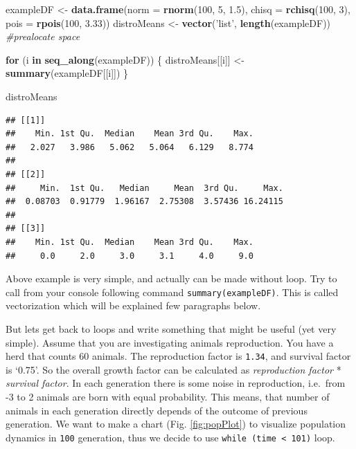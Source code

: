\documentclass[]{book}
\newenvironment{Shaded}{\begin{snugshade}}{\end{snugshade}}
\newcommand{\KeywordTok}[1]{\textcolor[rgb]{0.13,0.29,0.53}{\textbf{#1}}}
\newcommand{\DataTypeTok}[1]{\textcolor[rgb]{0.13,0.29,0.53}{#1}}
\newcommand{\DecValTok}[1]{\textcolor[rgb]{0.00,0.00,0.81}{#1}}
\newcommand{\FloatTok}[1]{\textcolor[rgb]{0.00,0.00,0.81}{#1}}
\newcommand{\StringTok}[1]{\textcolor[rgb]{0.31,0.60,0.02}{#1}}
\newcommand{\CommentTok}[1]{\textcolor[rgb]{0.56,0.35,0.01}{\textit{#1}}}
\newcommand{\ControlFlowTok}[1]{\textcolor[rgb]{0.13,0.29,0.53}{\textbf{#1}}}
\newcommand{\NormalTok}[1]{#1}
\theoremstyle{definition}
\theoremstyle{definition}
\theoremstyle{definition}
\theoremstyle{remark}
\begin{document}
\begin{Shaded}
\begin{Highlighting}[]
\NormalTok{exampleDF <-}\StringTok{ }\KeywordTok{data.frame}\NormalTok{(}\DataTypeTok{norm =} \KeywordTok{rnorm}\NormalTok{(}\DecValTok{100}\NormalTok{, }\DecValTok{5}\NormalTok{, }\FloatTok{1.5}\NormalTok{),}
                        \DataTypeTok{chisq =} \KeywordTok{rchisq}\NormalTok{(}\DecValTok{100}\NormalTok{, }\DecValTok{3}\NormalTok{),}
                        \DataTypeTok{pois =} \KeywordTok{rpois}\NormalTok{(}\DecValTok{100}\NormalTok{, }\FloatTok{3.33}\NormalTok{))}
\NormalTok{distroMeans <-}\StringTok{ }\KeywordTok{vector}\NormalTok{(}\StringTok{'list'}\NormalTok{, }\KeywordTok{length}\NormalTok{(exampleDF)) }\CommentTok{#prealocate space}

\ControlFlowTok{for}\NormalTok{ (i }\ControlFlowTok{in} \KeywordTok{seq_along}\NormalTok{(exampleDF)) \{}
\NormalTok{  distroMeans[[i]] <-}\StringTok{ }\KeywordTok{summary}\NormalTok{(exampleDF[[i]])}
\NormalTok{\}}

\NormalTok{distroMeans}
\end{Highlighting}
\end{Shaded}

\begin{verbatim}
## [[1]]
##    Min. 1st Qu.  Median    Mean 3rd Qu.    Max. 
##   2.027   3.986   5.062   5.064   6.129   8.774 
## 
## [[2]]
##     Min.  1st Qu.   Median     Mean  3rd Qu.     Max. 
##  0.08703  0.91779  1.96167  2.75308  3.57436 16.24115 
## 
## [[3]]
##    Min. 1st Qu.  Median    Mean 3rd Qu.    Max. 
##     0.0     2.0     3.0     3.1     4.0     9.0
\end{verbatim}

Above example is very simple, and actually can be made without loop. Try
to call from your console following command \texttt{summary(exampleDF)}.
This is called vectorization which will be explained few paragraphs
below.

But lets get back to loops and write something that might be useful (yet
very simple). Assume that you are investigating animals reproduction.
You have a herd that counts 60 animals. The reproduction factor is
\texttt{1.34}, and survival factor is `0.75'. So the overall growth
factor can be calculated as \emph{reproduction factor} * \emph{survival
factor}. In each generation there is some noise in reproduction,
i.e.~from -3 to 2 animals are born with equal probability. This means,
that number of animals in each generation directly depends of the
outcome of previous generation. We want to make a chart (Fig.
\ref{fig:popPlot}) to visualize population dynamics in \texttt{100}
generation, thus we decide to use
\texttt{while\ (time\ \textless{}\ 101)} loop.
\end{document}
